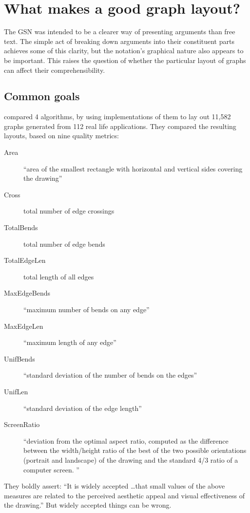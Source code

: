 \section{What makes a good graph layout?}

The GSN was intended to be a clearer way of presenting arguments than free text.
The simple act of breaking down arguments into their constituent parts achieves some of this clarity,
but the notation's graphical nature also appears to be important.
This raises the question of whether the particular layout of graphs can affect their comprehensibility.

\subsection{Common goals}

\citet{DiBattista1997303} compared 4 algorithms, by using implementations of them to lay out 11,582 graphs generated from 112 real life applications. They compared the resulting layouts, based on nine quality metrics:

\begin{description}
\item[Area]
``area of the smallest rectangle with horizontal and vertical sides covering the drawing''
\item[Cross]
total number of edge crossings
\item[TotalBends]
total number of edge bends
\item[TotalEdgeLen]
total length of all edges
\item[MaxEdgeBends]
``maximum number of bends on any edge''
\item[MaxEdgeLen]
``maximum length of any edge''
\item[UnifBends]
``standard deviation of the number of bends on the edges''
\item[UnifLen]
``standard deviation of the edge length''
\item[ScreenRatio]
``deviation from the optimal aspect ratio, computed as the difference between the width/height ratio of the best of the two possible orientations (portrait and landscape) of the drawing and the standard 4/3 ratio of a computer screen. ''
\end{description}

They boldly assert: ``It is widely accepted \ldots that small values of the above measures are related to the perceived aesthetic appeal and visual effectiveness of the drawing.''
But widely accepted things can be wrong. 

